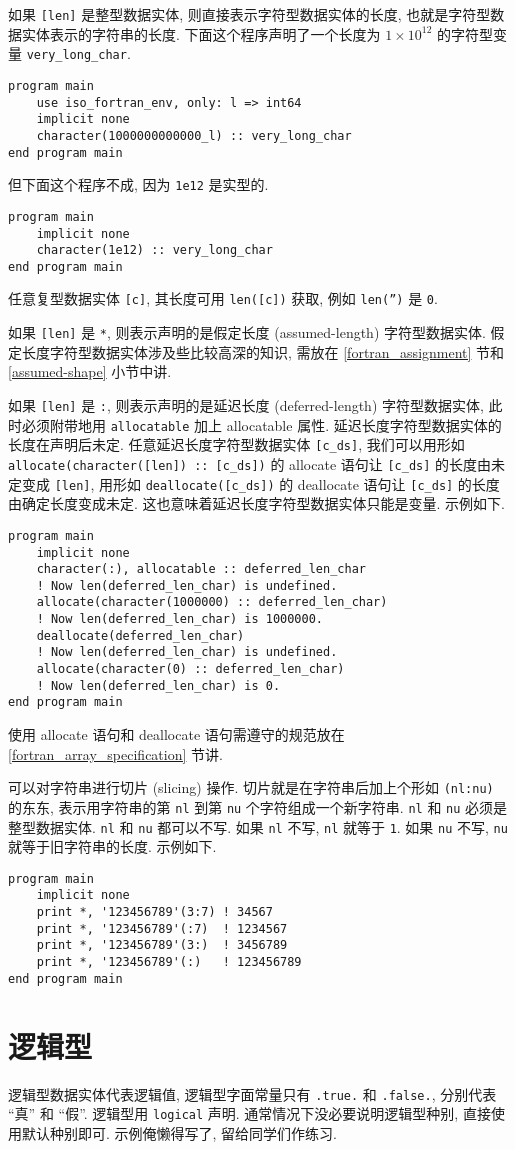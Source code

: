 如果 \texttt{[len]} 是整型数据实体, 则直接表示字符型数据实体的长度, 也就是字符型数据实体表示的字符串的长度. 下面这个程序声明了一个长度为 $1\times 10^{12}$ 的字符型变量 \texttt{very\_{}long\_{}char}.
\begin{lstlisting}
program main
    use iso_fortran_env, only: l => int64
    implicit none
    character(1000000000000_l) :: very_long_char
end program main
\end{lstlisting}
但下面这个程序不成, 因为 \texttt{1e12} 是实型的.
\begin{lstlisting}
program main
    implicit none
    character(1e12) :: very_long_char
end program main
\end{lstlisting}
任意复型数据实体 \texttt{[c]}, 其长度可用 \texttt{len([c])} 获取, 例如 \texttt{len('')} 是 \texttt{0}.

如果 \texttt{[len]} 是 \texttt{*}, 则表示声明的是假定长度 (assumed-length) 字符型数据实体. 假定长度字符型数据实体涉及些比较高深的知识, 需放在 \ref{fortran_assignment} 节和 \ref{assumed-shape} 小节中讲.

如果 \texttt{[len]} 是 \texttt{:}, 则表示声明的是延迟长度 (deferred-length) 字符型数据实体, 此时必须附带地用 \texttt{allocatable} 加上 allocatable 属性. 延迟长度字符型数据实体的长度在声明后未定. 任意延迟长度字符型数据实体 \texttt{[c\_{}ds]}, 我们可以用形如 \texttt{allocate(character([len]) :: [c\_{}ds])} 的 allocate 语句让 \texttt{[c\_{}ds]} 的长度由未定变成 \texttt{[len]}, 用形如 \texttt{deallocate([c\_{}ds])} 的 deallocate 语句让 \texttt{[c\_{}ds]} 的长度由确定长度变成未定. 这也意味着延迟长度字符型数据实体只能是变量. 示例如下.
\begin{lstlisting}
program main
    implicit none
    character(:), allocatable :: deferred_len_char
    ! Now len(deferred_len_char) is undefined.
    allocate(character(1000000) :: deferred_len_char)
    ! Now len(deferred_len_char) is 1000000.
    deallocate(deferred_len_char)
    ! Now len(deferred_len_char) is undefined.
    allocate(character(0) :: deferred_len_char)
    ! Now len(deferred_len_char) is 0.
end program main
\end{lstlisting}
使用 allocate 语句和 deallocate 语句需遵守的规范放在 \ref{fortran_array_specification} 节讲.

可以对字符串进行切片 (slicing) 操作. 切片就是在字符串后加上个形如 \texttt{(nl:nu)} 的东东, 表示用字符串的第 \texttt{nl} 到第 \texttt{nu} 个字符组成一个新字符串. \texttt{nl} 和 \texttt{nu} 必须是整型数据实体. \texttt{nl} 和 \texttt{nu} 都可以不写. 如果 \texttt{nl} 不写, \texttt{nl} 就等于 \texttt{1}. 如果 \texttt{nu} 不写, \texttt{nu} 就等于旧字符串的长度. 示例如下.
\begin{lstlisting}
program main
    implicit none
    print *, '123456789'(3:7) ! 34567
    print *, '123456789'(:7)  ! 1234567
    print *, '123456789'(3:)  ! 3456789
    print *, '123456789'(:)   ! 123456789
end program main
\end{lstlisting}

\section{逻辑型}

逻辑型数据实体代表逻辑值, 逻辑型字面常量只有 \texttt{.true.} 和 \texttt{.false.}, 分别代表 ``真'' 和 ``假''. 逻辑型用 \texttt{logical} 声明. 通常情况下没必要说明逻辑型种别, 直接使用默认种别即可. 示例俺懒得写了, 留给同学们作练习.
